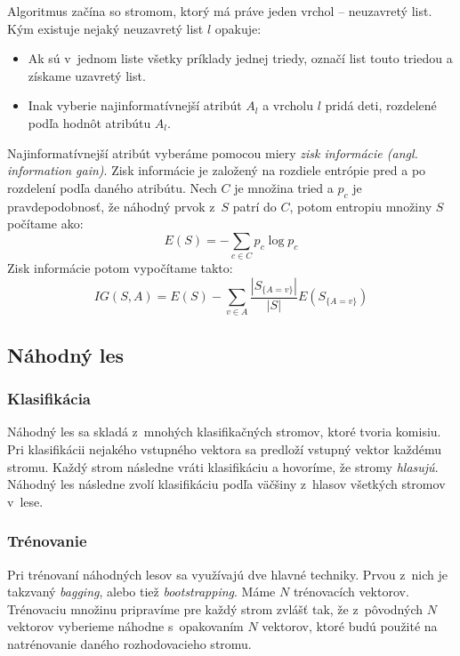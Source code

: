 Algoritmus začína so stromom, ktorý má práve jeden vrchol -- neuzavretý list. Kým existuje nejaký neuzavretý list $l$ opakuje:
\begin{itemize}
    \item Ak sú v~jednom liste všetky príklady jednej triedy, označí list touto triedou a získame uzavretý list.
    \item Inak vyberie najinformatívnejší atribút $A_l$ a vrcholu $l$ pridá deti, rozdelené podľa hodnôt atribútu $A_l$.
\end{itemize}

Najinformatívnejší atribút vyberáme pomocou miery \textit{zisk informácie (angl. information gain)}. Zisk informácie je založený na rozdiele entrópie pred a po rozdelení podľa daného atribútu. Nech $C$ je množina tried a $p_c$ je pravdepodobnosť, že náhodný prvok z~$S$ patrí do $C$, potom entropiu množiny $S$ počítame ako:
$$E(S) = -\sum_{c \in C} p_c\log{p_c}$$
Zisk informácie potom vypočítame takto:
$$IG(S,A) = E(S) - \sum_{v \in A} \frac{\left| S_{\{A=v\}} \right|}{\left| S \right|} E\left(S_{\{A=v\}}\right)$$

\subsection{Náhodný les}

\subsubsection{Klasifikácia}
Náhodný les sa skladá z~mnohých klasifikačných stromov, ktoré tvoria komisiu. Pri klasifikácii nejakého vstupného vektora sa predloží vstupný vektor každému stromu. Každý strom následne vráti klasifikáciu a hovoríme, že stromy \textit{hlasujú}. Náhodný les následne zvolí klasifikáciu podľa väčšiny z~hlasov všetkých stromov v~lese.


\subsubsection{Trénovanie}

Pri trénovaní náhodných lesov sa využívajú dve hlavné techniky. Prvou z~nich je takzvaný \textit{bagging}, alebo tiež \textit{bootstrapping}. Máme $N$ trénovacích vektorov. Trénovaciu množinu pripravíme pre každý strom zvlášť tak, že z~pôvodných $N$ vektorov vyberieme náhodne s~opakovaním $N$ vektorov, ktoré budú použité na natrénovanie daného rozhodovacieho stromu.


